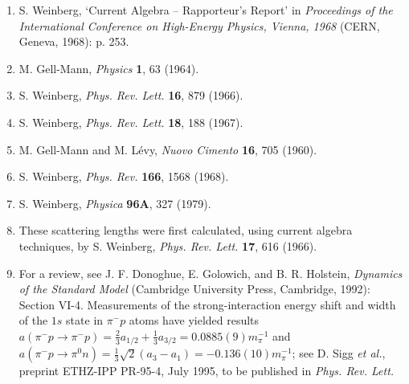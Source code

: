 \begin{enumerate}
\item {}\label{ch19-ref-20}
S. Weinberg, `Current Algebra -- Rapporteur's Report' in \emph{Proceedings of the International Conference on High-Energy Physics, Vienna, 1968} (CERN, Geneva, 1968): p. 253.

\item {}\label{ch19-ref-21}
M. Gell-Mann, \emph{Physics} \textbf{1}, 63 (1964).

\item {}\label{ch19-ref-22}
S. Weinberg, \emph{Phys. Rev. Lett.} \textbf{16}, 879 (1966).

\item {}\label{ch19-ref-23}
S. Weinberg, \emph{Phys. Rev. Lett.} \textbf{18}, 188 (1967).

\item {}\label{ch19-ref-24}
M. Gell-Mann and M. L\'evy, \emph{Nuovo Cimento} \textbf{16}, 705 (1960).

\item {}\label{ch19-ref-25}
S. Weinberg, \emph{Phys. Rev.} \textbf{166}, 1568 (1968).

\item {}\label{ch19-ref-26}
S. Weinberg, \emph{Physica} \textbf{96A}, 327 (1979).

\item {}\label{ch19-ref-27}
These scattering lengths were first calculated, using current algebra techniques, by S. Weinberg, \emph{Phys. Rev. Lett.} \textbf{17}, 616 (1966).

\item {}\label{ch19-ref-28}
For a review, see J. F. Donoghue, E. Golowich, and B. R. Holstein, \emph{Dynamics of the Standard Model} (Cambridge University Press, Cambridge, 1992): Section VI-4. Measurements of the strong-interaction energy shift and width of the $1s$ state in $\pi^-p$ atoms have yielded results $a(\pi^-p\to\pi^-p)=\frac23a_{1/2}+\frac13a_{3/2}=0.0885(9)m_\pi^{-1}$ and $a(\pi^-p\to\pi^0n)=\frac13\sqrt2(a_3-a_1)=-0.136(10)m_\pi^{-1}$; see D. Sigg \emph{et al.}, preprint ETHZ-IPP PR-95-4, July 1995, to be published in \emph{Phys. Rev. Lett.}


\end{enumerate}
